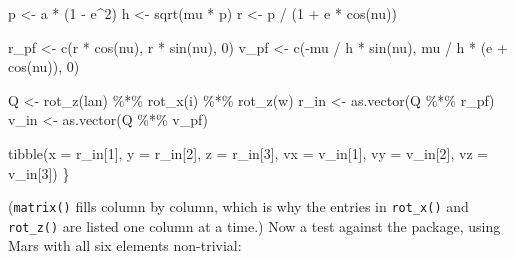 \documentclass[
  10.5pt,
  letterpaper,
]{scrbook}
\newenvironment{Shaded}{\begin{snugshade}}{\end{snugshade}}
\newcommand{\AttributeTok}[1]{\textcolor[rgb]{0.00,0.00,0.00}{#1}}
\newcommand{\DecValTok}[1]{\textcolor[rgb]{0.00,0.00,0.00}{#1}}
\newcommand{\FunctionTok}[1]{\textcolor[rgb]{0.00,0.00,0.00}{#1}}
\newcommand{\NormalTok}[1]{\textcolor[rgb]{0.00,0.00,0.00}{#1}}
\newcommand{\OtherTok}[1]{\textcolor[rgb]{0.00,0.00,0.00}{#1}}
\newcommand{\SpecialCharTok}[1]{\textcolor[rgb]{0.00,0.00,0.00}{#1}}
\theoremstyle{plain}
\theoremstyle{remark}
\begin{document}
\begin{Shaded}
\begin{Highlighting}[]
\NormalTok{  p }\OtherTok{\textless{}{-}}\NormalTok{ a }\SpecialCharTok{*}\NormalTok{ (}\DecValTok{1} \SpecialCharTok{{-}}\NormalTok{ e}\SpecialCharTok{\^{}}\DecValTok{2}\NormalTok{)}
\NormalTok{  h }\OtherTok{\textless{}{-}} \FunctionTok{sqrt}\NormalTok{(mu }\SpecialCharTok{*}\NormalTok{ p)}
\NormalTok{  r }\OtherTok{\textless{}{-}}\NormalTok{ p }\SpecialCharTok{/}\NormalTok{ (}\DecValTok{1} \SpecialCharTok{+}\NormalTok{ e }\SpecialCharTok{*} \FunctionTok{cos}\NormalTok{(nu))}

\NormalTok{  r\_pf }\OtherTok{\textless{}{-}} \FunctionTok{c}\NormalTok{(r }\SpecialCharTok{*} \FunctionTok{cos}\NormalTok{(nu), r }\SpecialCharTok{*} \FunctionTok{sin}\NormalTok{(nu), }\DecValTok{0}\NormalTok{)}
\NormalTok{  v\_pf }\OtherTok{\textless{}{-}} \FunctionTok{c}\NormalTok{(}\SpecialCharTok{{-}}\NormalTok{mu }\SpecialCharTok{/}\NormalTok{ h }\SpecialCharTok{*} \FunctionTok{sin}\NormalTok{(nu), mu }\SpecialCharTok{/}\NormalTok{ h }\SpecialCharTok{*}\NormalTok{ (e }\SpecialCharTok{+} \FunctionTok{cos}\NormalTok{(nu)), }\DecValTok{0}\NormalTok{)}

\NormalTok{  Q }\OtherTok{\textless{}{-}} \FunctionTok{rot\_z}\NormalTok{(lan) }\SpecialCharTok{\%*\%} \FunctionTok{rot\_x}\NormalTok{(i) }\SpecialCharTok{\%*\%} \FunctionTok{rot\_z}\NormalTok{(w)}
\NormalTok{  r\_in }\OtherTok{\textless{}{-}} \FunctionTok{as.vector}\NormalTok{(Q }\SpecialCharTok{\%*\%}\NormalTok{ r\_pf)}
\NormalTok{  v\_in }\OtherTok{\textless{}{-}} \FunctionTok{as.vector}\NormalTok{(Q }\SpecialCharTok{\%*\%}\NormalTok{ v\_pf)}

  \FunctionTok{tibble}\NormalTok{(}\AttributeTok{x =}\NormalTok{ r\_in[}\DecValTok{1}\NormalTok{], }\AttributeTok{y =}\NormalTok{ r\_in[}\DecValTok{2}\NormalTok{], }\AttributeTok{z =}\NormalTok{ r\_in[}\DecValTok{3}\NormalTok{],}
         \AttributeTok{vx =}\NormalTok{ v\_in[}\DecValTok{1}\NormalTok{], }\AttributeTok{vy =}\NormalTok{ v\_in[}\DecValTok{2}\NormalTok{], }\AttributeTok{vz =}\NormalTok{ v\_in[}\DecValTok{3}\NormalTok{])}
\NormalTok{\}}
\end{Highlighting}
\end{Shaded}

(\texttt{matrix()} fills column by column, which is why the entries in
\texttt{rot\_x()} and \texttt{rot\_z()} are listed one column at a
time.) Now a test against the package, using Mars with all six elements
non-trivial:
\end{document}
